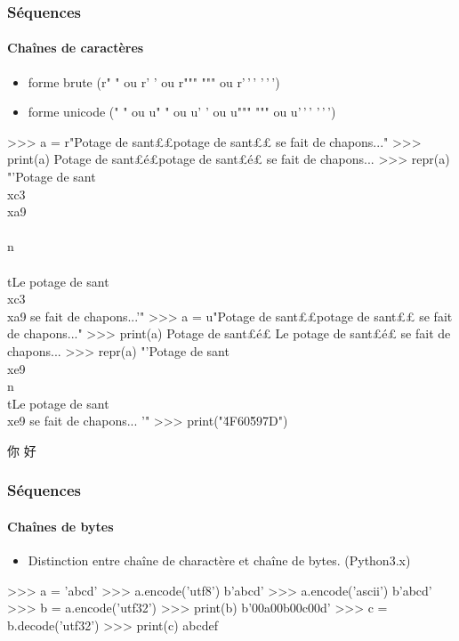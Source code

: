 \begin{frame}[fragile]
\frametitle{Séquences}
\framesubtitle{Chaînes de caractères}
\begin{itemize}
 \item forme brute (r" " ou r' ' ou r""" """ ou r'\,'\,' '\,'\,')
 \item forme unicode (" " ou u" " ou u' ' ou u""" """ ou u'\,'\,' '\,'\,')
\end{itemize}
\begin{pythonConsole}
>>> a = r"Potage de sant£\color{magenta}{é}£\n\tLe potage de sant£\color{magenta}{é}£ se fait de chapons..."
>>> print(a)
Potage de sant£é£\n\tLe potage de sant£é£ se fait de chapons...
>>> repr(a)
"'Potage de sant\\xc3\\xa9\\\\n\\\\tLe potage de sant\\xc3\\xa9 se fait 
de chapons...'"
>>> a = u"Potage de sant£\color{magenta}{é}£\n\tLe potage de sant£\color{magenta}{é}£ se fait de chapons..."
>>> print(a)
Potage de sant£é£
    Le potage de sant£é£ se fait de chapons...
>>> repr(a)
"'Potage de sant\\xe9\\n\\tLe potage de sant\\xe9 se fait de chapons...
'"
>>> print("\u4F60\u597D")
\end{pythonConsole}
\begin{CJK*}{UTF8}{gbsn}
你 好
\end{CJK*}
\end{frame}
\begin{frame}[fragile]
\frametitle{Séquences}
\framesubtitle{Chaînes de bytes}
\begin{itemize}
 \item Distinction entre chaîne de charactère et chaîne de bytes. (Python3.x) 
\end{itemize}
\begin{pythonConsole}
>>> a = 'abcd'
>>> a.encode('utf8')
b'abcd'
>>> a.encode('ascii')
b'abcd'
>>> b = a.encode('utf32')
>>> print(b)
b'\xff\xfe{}\x00a\x00b\x00c\x00d'
>>> c = b.decode('utf32')
>>> print(c)
abcdef
\end{pythonConsole}
\end{frame}
